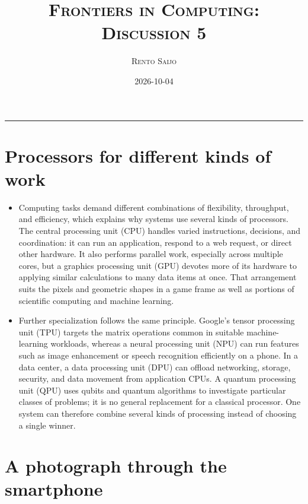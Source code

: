 \documentclass[10pt]{article}
\title{\Large\textsc{Frontiers in Computing: Discussion 5}}
\author{\large\textsc{Rento Saijo}}
\date{2026-10-04}
\begin{document}
\maketitle
\thispagestyle{fancy}
\vspace{-1em}\rule{\linewidth}{0.6pt}\vspace{0.5em}

\section*{Processors for different kinds of work}

\begin{itemize}[leftmargin=1.25em, itemsep=0.3em, parsep=0pt, topsep=0pt]
    \item Computing tasks demand different combinations of flexibility, throughput, and efficiency, which explains why systems use several kinds of processors. The central processing unit (CPU) handles varied instructions, decisions, and coordination: it can run an application, respond to a web request, or direct other hardware. It also performs parallel work, especially across multiple cores, but a graphics processing unit (GPU) devotes more of its hardware to applying similar calculations to many data items at once. That arrangement suits the pixels and geometric shapes in a game frame as well as portions of scientific computing and machine learning.

    \item Further specialization follows the same principle. Google's tensor processing unit (TPU) targets the matrix operations common in suitable machine-learning workloads, whereas a neural processing unit (NPU) can run features such as image enhancement or speech recognition efficiently on a phone. In a data center, a data processing unit (DPU) can offload networking, storage, security, and data movement from application CPUs. A quantum processing unit (QPU) uses qubits and quantum algorithms to investigate particular classes of problems; it is no general replacement for a classical processor. One system can therefore combine several kinds of processing instead of choosing a single winner.
\end{itemize}

\section*{A photograph through the smartphone}
\end{document}
